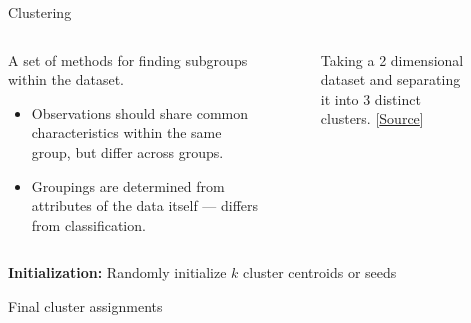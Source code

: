 \begin{frame}[allowframebreaks]{Clustering}
\begin{columns}
    \begin{column}{0.45\textwidth}
        A set of methods for finding  subgroups within the dataset. 
        \vspace{0.8em}
        \begin{itemize}
            \setlength{\itemsep}{0.5em}
            \item Observations should share  common characteristics within the  same group, but differ across  groups.
            \item Groupings are determined from  attributes of the data itself —  differs from classification.
        \end{itemize}
    \end{column}
    \begin{column}{0.55\textwidth}
        \begin{figure}
            \centering
            \caption{Taking a 2 dimensional dataset and separating it into 3 distinct clusters. [\href{https://medium.com/square-corner-blog/so-you-have-some-clusters-now-what-abfd297a575b}{Source}]}
        \end{figure}
    \end{column}
\end{columns}

\framebreak

\begin{algorithm}[H]
\caption{Generic Clustering Algorithm}


\vspace{0.5em}
\textbf{Initialization:} Randomly initialize $k$ cluster centroids or seeds\;

\vspace{0.5em}

\vspace{0.5em}
\Return Final cluster assignments\;
\vspace{0.8em}

\end{algorithm}
\end{frame}

